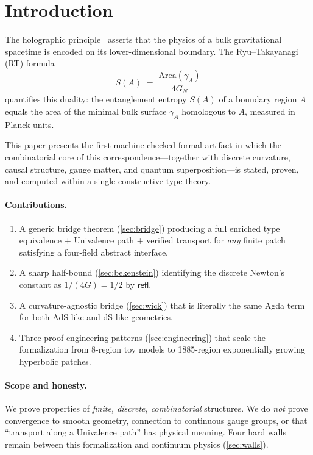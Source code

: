 \documentclass[11pt,a4paper]{article}
\newcommand{\refl}{\mathsf{refl}}
\begin{document}
\section{Introduction}
\label{sec:intro}

The holographic principle~\cite{Maldacena1997,Ryu2006} asserts that
the physics of a bulk gravitational spacetime is encoded on its
lower-dimensional boundary.  The Ryu--Takayanagi (RT) formula
\[
  S(A) \;=\; \frac{\mathrm{Area}(\gamma_A)}{4 G_N}
\]
quantifies this duality: the entanglement entropy $S(A)$ of a
boundary region $A$ equals the area of the minimal bulk surface
$\gamma_A$ homologous to $A$, measured in Planck units.

This paper presents the first machine-checked formal artifact in
which the combinatorial core of this correspondence---together with
discrete curvature, causal structure, gauge matter, and quantum
superposition---is stated, proven, and computed within a single
constructive type theory.

\paragraph{Contributions.}
\begin{enumerate}[nosep]
\item A generic bridge theorem (\cref{sec:bridge}) producing a
  full enriched type equivalence + Univalence path + verified
  transport for \emph{any} finite patch satisfying a four-field
  abstract interface.
\item A sharp half-bound (\cref{sec:bekenstein}) identifying the
  discrete Newton's constant as $1/(4G) = 1/2$ by $\refl$.
\item A curvature-agnostic bridge (\cref{sec:wick}) that is
  literally the same Agda term for both AdS-like and dS-like
  geometries.
\item Three proof-engineering patterns (\cref{sec:engineering})
  that scale the formalization from 8-region toy models to
  1885-region exponentially growing hyperbolic patches.
\end{enumerate}

\paragraph{Scope and honesty.}
We prove properties of \emph{finite, discrete, combinatorial}
structures.  We do \emph{not} prove convergence to smooth
geometry, connection to continuous gauge groups, or that
``transport along a Univalence path'' has physical meaning.
Four hard walls remain between this formalization and continuum
physics (\cref{sec:walls}).
\end{document}
